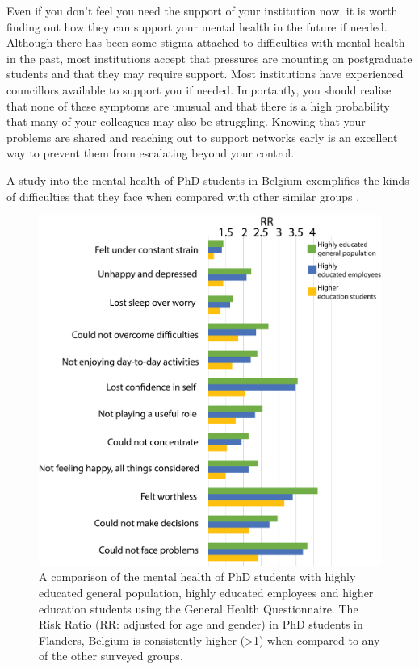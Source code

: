 \documentclass[
]{krantz}
\begin{document}
Even if you don't feel you need the support of your institution now, it is worth finding out how they can support your mental health in the future if needed. Although there has been some stigma attached to difficulties with mental health in the past, most institutions accept that pressures are mounting on postgraduate students and that they may require support. Most institutions have experienced councillors available to support you if needed. Importantly, you should realise that none of these symptoms are unusual and that there is a high probability that many of your colleagues may also be struggling. Knowing that your problems are shared and reaching out to support networks early is an excellent way to prevent them from escalating beyond your control.

A study into the mental health of PhD students in Belgium exemplifies the kinds of difficulties that they face when compared with other similar groups \citep{levecque2017work}.



\begin{figure}
\includegraphics[width=0.8\linewidth]{figures/Mental-health} \caption{A comparison of the mental health of PhD students \citep[data from][]{levecque2017work} with highly educated general population, highly educated employees and higher education students using the General Health Questionnaire. The Risk Ratio (RR: adjusted for age and gender) in PhD students in Flanders, Belgium is consistently higher (\textgreater1) when compared to any of the other surveyed groups.}\label{fig:Mental-health}
\end{figure}
\end{document}
